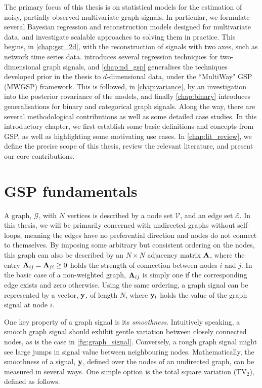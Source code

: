 The primary focus of this thesis is on statistical models for the estimation of noisy, partially observed multivariate graph signals. In particular, we formulate several Bayesian regression and reconstruction models designed for multivariate data, and investigate scalable approaches to solving them in practice. This begins, in \cref{chap:gsr_2d}, with the reconstruction of signals with two axes, such as network time series data.  introduces several regression techniques for two-dimensional graph signals, and \cref{chap:nd_gsp} generalises the techniques developed prior in the thesis to $d$-dimensional data, under the ``MultiWay" GSP (MWGSP) framework. This is followed, in \cref{chap:variance}, by an investigation into the posterior covariance of the models, and finally \cref{chap:binary} introduces generalisations for binary and categorical graph signals. Along the way, there are several methodological contributions as well as some detailed case studies. In this introductory chapter, we first establish some basic definitions and concepts from GSP, as well as highlighting some motivating use cases. In \cref{chap:lit_review}, we define the precise scope of this thesis, review the relevant literature, and present our core contributions. 


\section{GSP fundamentals}

A graph, $\mathcal{G}$, with $N$ vertices is described by a node set $\mathcal{V}$, and an edge set $\mathcal{E}$. In this thesis, we will be primarily concerned with undirected graphs without self-loops, meaning the edges have no preferential direction and nodes do not connect to themselves. By imposing some arbitrary but consistent ordering on the nodes, this graph can also be described by an $N \times N$ adjacency matrix $\mathbf{A}$, where the entry $\mathbf{A}_{ij} = \mathbf{A}_{ji} \geq 0$ holds the strength of connection between nodes $i$ and $j$. In the basic case of a non-weighted graph, $\mathbf{A}_{ij}$ is simply one if the corresponding edge exists and zero otherwise. Using the same ordering, a graph signal can be represented by a vector, $\mathbf{y}$, of length $N$, where $\mathbf{y}_i$ holds the value of the graph signal at node $i$. 

One key property of a graph signal is its \textit{smoothness}. Intuitively speaking, a smooth graph signal should exhibit gentle variation between closely connected nodes, as is the case in \cref{fig:graph_signal}. Conversely, a rough graph signal might see large jumps in signal value between neighbouring nodes. Mathematically, the smoothness of a signal, $\mathbf{y}$, defined over the nodes of an undirected graph, can be measured in several ways. One simple option is the total square variation ($\text{TV}_2$), defined as follows. 

